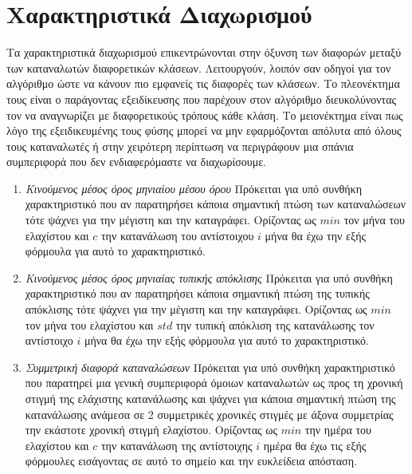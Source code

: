 \documentclass[a4paper, 11pt]{article}
\begin{document}
\section*{Χαρακτηριστικά Διαχωρισμού}
Τα χαρακτηριστικά διαχωρισμού επικεντρώνονται στην όξυνση των διαφορών μεταξύ των καταναλωτών διαφορετικών κλάσεων. Λειτουργούν, λοιπόν σαν οδηγοί για τον αλγόριθμο ώστε να κάνουν πιο εμφανείς τις διαφορές των κλάσεων. Το πλεονέκτημα τους είναι ο παράγοντας εξειδίκευσης που παρέχουν στον αλγόριθμο διευκολύνοντας τον να αναγνωρίζει με διαφορετικούς τρόπους κάθε κλάση. Το μειονέκτημα είναι πως λόγο της εξειδικευμένης τους φύσης μπορεί να μην εφαρμόζονται απόλυτα από όλους τους καταναλωτές ή στην χειρότερη περίπτωση να περιγράφουν μια σπάνια συμπεριφορά που δεν ενδιαφερόμαστε να διαχωρίσουμε.
\begin{enumerate}
\item{\textit{Κινούμενος μέσος όρος μηνιαίου μέσου όρου}} Πρόκειται για υπό συνθήκη χαρακτηριστικό που αν παρατηρήσει κάποια σημαντική πτώση των καταναλώσεων τότε ψάχνει για την μέγιστη και την καταγράφει. Ορίζοντας ως $min$ τον μήνα του ελαχίστου και $c$ την κατανάλωση του αντίστοιχου $i$ μήνα θα έχω την εξής φόρμουλα για αυτό το χαρακτηριστικό. 
\begin{center}
\end{center}
\item{\textit{Κινούμενος μέσος όρος μηνιαίας τυπικής απόκλισης}} Πρόκειται για υπό συνθήκη χαρακτηριστικό που αν παρατηρήσει κάποια σημαντική πτώση της τυπικής απόκλισης τότε ψάχνει για την μέγιστη και την καταγράφει. Ορίζοντας ως $min$ τον μήνα του ελαχίστου και $std$ την τυπική απόκλιση της κατανάλωσης τον αντίστοιχο $i$ μήνα θα έχω την εξής φόρμουλα για αυτό το χαρακτηριστικό. 
\begin{center}
\end{center}
\item{\textit{Συμμετρική διαφορά καταναλώσεων}} Πρόκειται για υπό συνθήκη χαρακτηριστικό που παρατηρεί μια γενική συμπεριφορά όμοιων καταναλωτών ως προς τη χρονική στιγμή της ελάχιστης κατανάλωσης και ψάχνει για κάποια σημαντική πτώση της κατανάλωσης ανάμεσα σε 2 συμμετρικές χρονικές στιγμές με άξονα συμμετρίας την εκάστοτε χρονική στιγμή ελαχίστου. Ορίζοντας ως $min$ την ημέρα του ελαχίστου και $c$ την κατανάλωση της αντίστοιχης $i$ ημέρα θα έχω τις εξής φόρμουλες εισάγοντας σε αυτό το σημείο και την ευκλείδεια απόσταση.

\end{enumerate}
\end{document}

